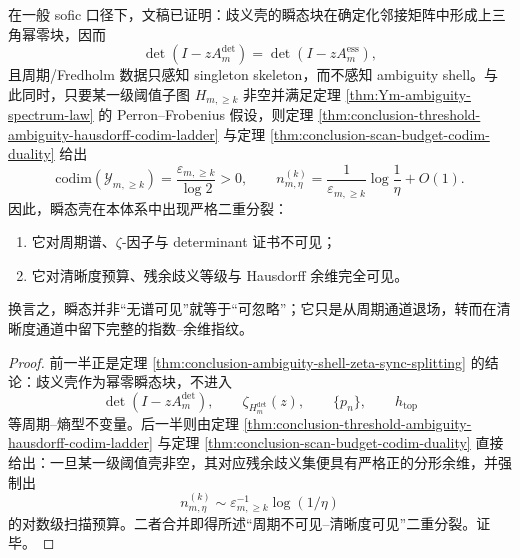 \begin{theorem}\label{thm:conclusion-transient-shell-period-invisible-clarity-visible-splitting}
在一般 sofic 口径下，文稿已证明：歧义壳的瞬态块在确定化邻接矩阵中形成上三角幂零块，因而
\[
\det(I-zA_m^{\mathrm{det}})=\det(I-zA_m^{\mathrm{ess}}),
\]
且周期/Fredholm 数据只感知 singleton skeleton，而不感知 ambiguity shell。与此同时，只要某一级阈值子图 \(H_{m,\ge k}\) 非空并满足定理 \ref{thm:Ym-ambiguity-spectrum-law} 的 Perron--Frobenius 假设，则定理 \ref{thm:conclusion-threshold-ambiguity-hausdorff-codim-ladder} 与定理 \ref{thm:conclusion-scan-budget-codim-duality} 给出
\[
\mathrm{codim}(\mathcal Y_{m,\ge k})
=
\frac{\varepsilon_{m,\ge k}}{\log 2}>0,
\qquad
n_{m,\eta}^{(k)}
=
\frac{1}{\varepsilon_{m,\ge k}}\log\frac1\eta+O(1).
\]
因此，瞬态壳在本体系中出现严格二重分裂：
\begin{enumerate}
\normalfont
  \item 它对周期谱、\(\zeta\)-因子与 determinant 证书不可见；
  \item 它对清晰度预算、残余歧义等级与 Hausdorff 余维完全可见。
\end{enumerate}
换言之，瞬态并非“无谱可见”就等于“可忽略”；它只是从周期通道退场，转而在清晰度通道中留下完整的指数--余维指纹。
\end{theorem}
\begin{proof}
前一半正是定理 \ref{thm:conclusion-ambiguity-shell-zeta-sync-splitting} 的结论：歧义壳作为幂零瞬态块，不进入
\[
\det(I-zA_m^{\mathrm{det}}),\qquad \zeta_{H_m^{\mathrm{det}}}(z),\qquad \{p_n\},\qquad h_{\mathrm{top}}
\]
等周期--熵型不变量。后一半则由定理 \ref{thm:conclusion-threshold-ambiguity-hausdorff-codim-ladder} 与定理 \ref{thm:conclusion-scan-budget-codim-duality} 直接给出：一旦某一级阈值壳非空，其对应残余歧义集便具有严格正的分形余维，并强制出
\[
n_{m,\eta}^{(k)}\sim \varepsilon_{m,\ge k}^{-1}\log(1/\eta)
\]
的对数级扫描预算。二者合并即得所述“周期不可见--清晰度可见”二重分裂。证毕。
\end{proof}

